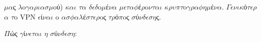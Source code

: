 \documentclass[a4paper,11pt,english]{sphinxmanual}
\begin{document}
\(\mu\)\(\alpha\)ς \(\lambda\)o\(\gamma\)\(\alpha\)\(\rho\)\(\iota\)\(\alpha\)\(\sigma\)\(\mu\)oύ) \(\kappa\)\(\alpha\)\(\iota\) \(\tau\)\(\alpha\) \(\delta\)\(\epsilon\)\(\delta\)o\(\mu\)έ\(\nu\)\(\alpha\) \(\mu\)\(\epsilon\)\(\tau\)\(\alpha\)\(\phi\)έ\(\rho\)o\(\nu\)\(\tau\)\(\alpha\)\(\iota\) \(\kappa\)\(\rho\)\(\upsilon\)\(\pi\)\(\tau\)o\(\gamma\)\(\rho\)\(\alpha\)\(\phi\)\(\eta\)\(\mu\)έ\(\nu\)\(\alpha\).
\(\Gamma\)\(\epsilon\)\(\nu\)\(\iota\)\(\kappa\)ό\(\tau\)\(\epsilon\)\(\rho\)\(\alpha\) \(\tau\)o VPN \(\epsilon\)ί\(\nu\)\(\alpha\)\(\iota\) o \(\alpha\)\(\sigma\)\(\phi\)\(\alpha\)\(\lambda\)έ\(\sigma\)\(\tau\)\(\epsilon\)\(\rho\)oς \(\tau\)\(\rho\)ό\(\pi\)oς \(\sigma\)ύ\(\nu\)\(\delta\)\(\epsilon\)\(\sigma\)\(\eta\)ς.

\(\Pi\)ώς \(\gamma\)ί\(\nu\)\(\epsilon\)\(\tau\)\(\alpha\)\(\iota\) \(\eta\) \(\sigma\)ύ\(\nu\)\(\delta\)\(\epsilon\)\(\sigma\)\(\eta\):
\end{document}
